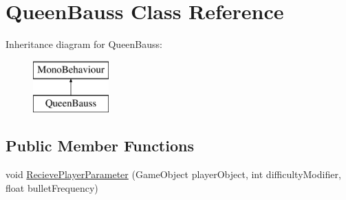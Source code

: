 \hypertarget{class_queen_bauss}{}\section{Queen\+Bauss Class Reference}
\label{class_queen_bauss}
Inheritance diagram for Queen\+Bauss\+:\begin{figure}[H]
\begin{center}
\leavevmode
\includegraphics[height=2.000000cm]{class_queen_bauss}
\end{center}
\end{figure}
\subsection*{Public Member Functions}
\begin{DoxyCompactItemize}
\item 
void \mbox{\hyperlink{class_queen_bauss_a40fa065ef12d2fa9e9483c271d3e75a6}{Recieve\+Player\+Parameter}} (Game\+Object player\+Object, int difficulty\+Modifier, float bullet\+Frequency)
\end{DoxyCompactItemize}
